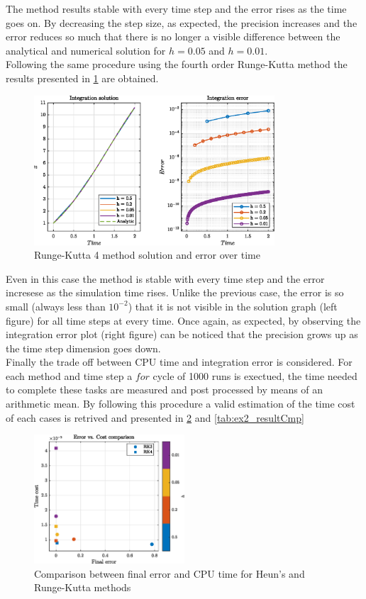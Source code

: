 \documentclass[11pt,a4paper,oneside]{article}
\begin{document}
The method results stable with every time step and the error rises as the time goes on.
By decreasing the step size, as expected, the precision increases and the error reduces so much that there is no longer a visible difference between the analytical and numerical solution for $h=0.05$ and $h=0.01$.  
\\
Following the same procedure using the fourth order Runge-Kutta method the results presented in \cref{fig:ex2_rk4} are obtained.

\begin{figure}[htb]
    \centering
    \includegraphics*[width=0.8\textwidth, keepaspectratio]{ex2_rk4.eps}
    \caption[]{\label{fig:ex2_rk4} Runge-Kutta 4 method solution and error over time}
\end{figure}

Even in this case the method is stable with every time step and the error incresese as the simulation time rises.
Unlike the previous case, the error is so small (always less than $10^{-2}$) that it is not visible in the solution graph (left figure) for all time steps at every time.
Once again, as expected, by observing the integration error plot (right figure) can be noticed that the precision grows up as the time step dimension goes down. 
\\
Finally the trade off between CPU time and integration error is considered. For each method and time step a $for$ cycle of 1000 runs is exectued, the time needed to complete these tasks are measured and post processed by means of an arithmetic mean.
By following this procedure a valid estimation of the time cost of each cases is retrived and presented in \cref{fig:ex2_error} and \cref{tab:ex2_resultCmp}

\begin{figure}[htb]
    \centering
    \includegraphics*[width=0.5\textwidth, keepaspectratio]{ex2_error.eps}
    \caption[]{\label{fig:ex2_error} Comparison between final error and CPU time for Heun's and Runge-Kutta methods}
\end{figure}
\end{document}

